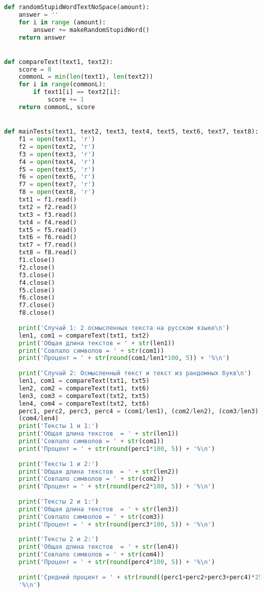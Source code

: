 \documentclass[12pt]{article}
\begin{document}
\begin{lstlisting}[language=Python]
def randomStupidWordTextNoSpace(amount):
    answer = ''
    for i in range (amount):
        answer += makeRandomStupidWord()
    return answer


def compareText(text1, text2):
    score = 0
    commonL = min(len(text1), len(text2))
    for i in range(commonL):
        if text1[i] == text2[i]:
            score += 1
    return commonL, score


def mainTests(text1, text2, text3, text4, text5, text6, text7, text8):
    f1 = open(text1, 'r')
    f2 = open(text2, 'r')
    f3 = open(text3, 'r')
    f4 = open(text4, 'r')
    f5 = open(text5, 'r')
    f6 = open(text6, 'r')
    f7 = open(text7, 'r')
    f8 = open(text8, 'r')
    txt1 = f1.read()
    txt2 = f2.read()
    txt3 = f3.read()
    txt4 = f4.read()
    txt5 = f5.read()
    txt6 = f6.read()
    txt7 = f7.read()
    txt8 = f8.read()
    f1.close()
    f2.close()
    f3.close()
    f4.close()
    f5.close()
    f6.close()
    f7.close()
    f8.close()
    
    print('Случай 1: 2 осмысленных текста на русском языке\n')
    len1, com1 = compareText(txt1, txt2)
    print('Общая длина текстов = ' + str(len1))
    print('Совпало символов = ' + str(com1))
    print('Процент = ' + str(round(com1/len1*100, 5)) + '%\n')
    
    print('Случай 2: Осмысленный текст и текст из рандомных букв\n')
    len1, com1 = compareText(txt1, txt5)
    len2, com2 = compareText(txt1, txt6)
    len3, com3 = compareText(txt2, txt5)
    len4, com4 = compareText(txt2, txt6)
    perc1, perc2, perc3, perc4 = (com1/len1), (com2/len2), (com3/len3),
    (com4/len4)
    print('Тексты 1 и 1:')
    print('Общая длина текстов  = ' + str(len1))
    print('Совпало символов = ' + str(com1))
    print('Процент = ' + str(round(perc1*100, 5)) + '%\n')
    
    print('Тексты 1 и 2:')
    print('Общая длина текстов  = ' + str(len2))
    print('Совпало символов = ' + str(com2))
    print('Процент = ' + str(round(perc2*100, 5)) + '%\n')
    
    print('Тексты 2 и 1:')
    print('Общая длина текстов  = ' + str(len3))
    print('Совпало символов = ' + str(com3))
    print('Процент = ' + str(round(perc3*100, 5)) + '%\n')
    
    print('Тексты 2 и 2:')
    print('Общая длина текстов  = ' + str(len4))
    print('Совпало символов = ' + str(com4))
    print('Процент = ' + str(round(perc4*100, 5)) + '%\n')
    
    print('Средний процент = ' + str(round((perc1+perc2+perc3+perc4)*25, 5)) +
    '%\n')
    

\end{lstlisting}
\end{document}
